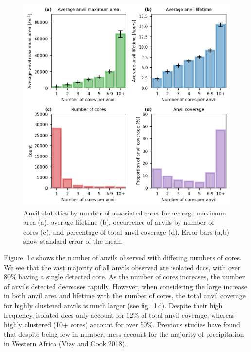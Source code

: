 \begin{figure}[tp]
    \includegraphics[width=\textwidth]{figures/ch3_06.png}
    \caption[
    Anvil statistics by number of associated cores for average maximum area, average lifetime, occurrence of anvils by number of cores, and percentage of total anvil coverage
    ]{
    Anvil statistics by number of associated cores for average maximum area (a), average lifetime (b), occurrence of anvils by number of cores (c), and percentage of total anvil coverage (d). Error bars (a,b) show standard error of the mean.
    }
    \label{fig:seviri_anvil_stats}
\end{figure}


Figure~\ref{fig:seviri_anvil_stats}\,c shows the number of anvils observed with differing numbers
of cores. We see that the vast majority of all anvils observed are
isolated \acrshort{dcc}s, with over 80\% having a single detected core. As the
number of cores increases, the number of anvils detected decreases
rapidly. However, when considering the large increase in both anvil area
and lifetime with the number of cores, the total anvil coverage for
highly clustered anvils is much larger (see fig.~\ref{fig:seviri_anvil_stats}\,d). Despite their
high frequency, isolated \acrshort{dcc}s only account for 12\% of total anvil
coverage, whereas highly clustered (10+ cores) account for over 50\%.
Previous studies have found that despite being few in number, \acrshort{mcs}s
account for the majority of precipitation in Western Africa (Vizy and
Cook 2018).


